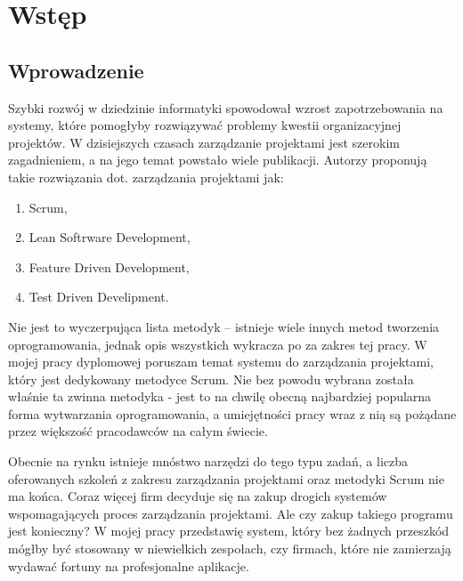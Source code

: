 \chapter{Wstęp}
\section{Wprowadzenie}

Szybki rozwój w dziedzinie informatyki spowodował wzrost zapotrzebowania na systemy, które pomogłyby rozwiązywać problemy kwestii organizacyjnej projektów. W dzisiejszych czasach zarządzanie projektami jest szerokim zagadnieniem, a na jego temat powstało wiele publikacji. Autorzy proponują takie rozwiązania dot. zarządzania projektami jak:
\begin{enumerate}
	\item Scrum,
	\item Lean Softrware Development,
	\item Feature Driven Development,
	\item Test Driven Develipment.
\end{enumerate}

Nie jest to wyczerpująca lista metodyk -- istnieje wiele innych metod tworzenia oprogramowania, jednak opis wszystkich wykracza po za zakres tej pracy. W mojej pracy dyplomowej poruszam temat systemu do zarządzania projektami, który jest dedykowany metodyce Scrum. Nie bez powodu wybrana została właśnie ta zwinna metodyka - jest to na chwilę obecną najbardziej popularna forma wytwarzania oprogramowania, a umiejętności pracy wraz z nią są pożądane przez większość pracodawców na całym świecie.

Obecnie na rynku istnieje mnóstwo narzędzi do tego typu zadań, a liczba oferowanych szkoleń z zakresu zarządzania projektami oraz metodyki Scrum nie ma końca. Coraz więcej firm decyduje się na zakup drogich systemów wspomagających proces zarządzania projektami. Ale czy zakup takiego programu jest konieczny? W mojej pracy przedstawię system, który bez żadnych przeszkód mógłby być stosowany w niewielkich zespołach, czy firmach, które nie zamierzają wydawać fortuny na profesjonalne aplikacje.

